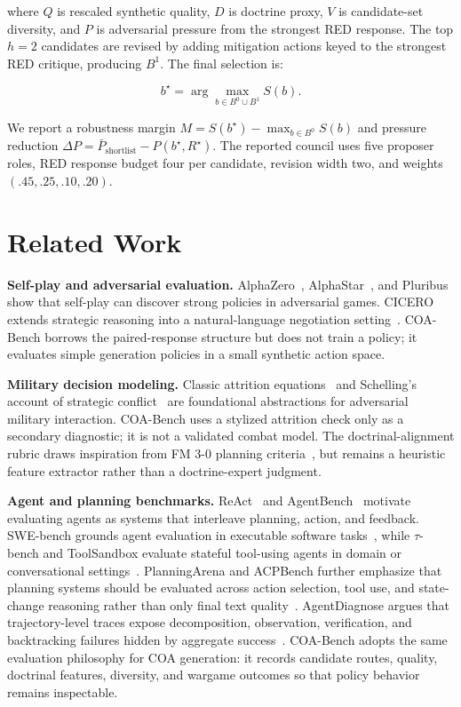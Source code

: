 \documentclass[sigconf]{acmart}
\begin{document}
where $Q$ is rescaled synthetic quality, $D$ is doctrine proxy, $V$ is candidate-set diversity, and $P$ is adversarial pressure from the strongest RED response. The top $h=2$ candidates are revised by adding mitigation actions keyed to the strongest RED critique, producing $B^1$. The final selection is:

\begin{equation}
b^\star = \arg\max_{b \in B^0 \cup B^1} S(b).
\end{equation}

We report a robustness margin $M=S(b^\star)-\max_{b\in B^0}S(b)$ and pressure reduction $\Delta P=\bar{P}_{\mathrm{shortlist}}-P(b^\star,R^\star)$. The reported council uses five proposer roles, RED response budget four per candidate, revision width two, and weights $(.45,.25,.10,.20)$.

\section{Related Work}

\textbf{Self-play and adversarial evaluation.} AlphaZero~\cite{silver2018alphazero}, AlphaStar~\cite{vinyals2019alphastar}, and Pluribus~\cite{brown2019superhuman} show that self-play can discover strong policies in adversarial games. CICERO extends strategic reasoning into a natural-language negotiation setting~\cite{bakhtin2022cicero}. COA-Bench borrows the paired-response structure but does not train a policy; it evaluates simple generation policies in a small synthetic action space.

\textbf{Military decision modeling.} Classic attrition equations~\cite{lanchester1916} and Schelling's account of strategic conflict~\cite{schelling1960} are foundational abstractions for adversarial military interaction. COA-Bench uses a stylized attrition check only as a secondary diagnostic; it is not a validated combat model. The doctrinal-alignment rubric draws inspiration from FM 3-0 planning criteria~\cite{fm30}, but remains a heuristic feature extractor rather than a doctrine-expert judgment.

\textbf{Agent and planning benchmarks.} ReAct~\cite{yao2023react} and AgentBench~\cite{liu2024agentbench} motivate evaluating agents as systems that interleave planning, action, and feedback. SWE-bench grounds agent evaluation in executable software tasks~\cite{jimenez2024swebench}, while $\tau$-bench and ToolSandbox evaluate stateful tool-using agents in domain or conversational settings~\cite{yao2024taubench,lu2025toolsandbox}. PlanningArena and ACPBench further emphasize that planning systems should be evaluated across action selection, tool use, and state-change reasoning rather than only final text quality~\cite{zheng2025planningarena,kokel2025acpbench}. AgentDiagnose argues that trajectory-level traces expose decomposition, observation, verification, and backtracking failures hidden by aggregate success~\cite{ou2025agentdiagnose}. COA-Bench adopts the same evaluation philosophy for COA generation: it records candidate routes, quality, doctrinal features, diversity, and wargame outcomes so that policy behavior remains inspectable.
\end{document}
